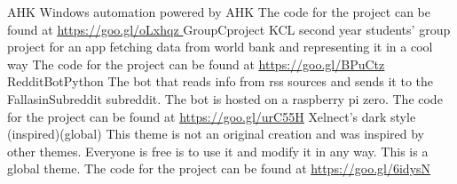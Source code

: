 




\cventryone
{AHK}
{
Windows automation powered by AHK
The code for the project can be found at 
\href{https://goo.gl/oLxhqz }{\color{darkblueforurl} \underline{https://goo.gl/oLxhqz }}
}
\vspace{+3mm}
\cventryone
{GroupCproject}
{
KCL second year students' group project for an app fetching data from world bank and representing it in a cool way
The code for the project can be found at 
\href{https://goo.gl/BPuCtz }{\color{darkblueforurl} \underline{https://goo.gl/BPuCtz }}
}
\vspace{+3mm}
\cventryone
{RedditBotPython}
{
The bot that reads info from rss sources and sends it to the FallasinSubreddit subreddit. The bot is hosted on a raspberry pi zero.
The code for the project can be found at 
\href{https://goo.gl/urC55H}{\color{darkblueforurl} \underline{https://goo.gl/urC55H}}
}
\vspace{+3mm}
\cventryone
{Xelnect's dark style (inspired)(global)}
{
This theme is not an original creation and was inspired by other themes. Everyone is free is to use it and modify it in any way. This is a global theme.
The code for the project can be found at 
\href{https://goo.gl/6idysN}{\color{darkblueforurl} \underline{https://goo.gl/6idysN}}
}

\vspace{+1mm}


